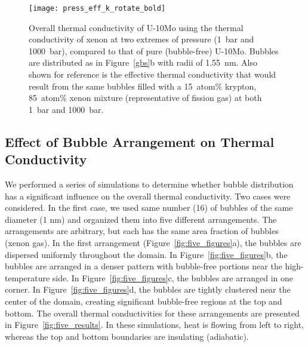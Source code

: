 \begin{figure}
	\centering
	\texttt{[image: press\_eff\_k\_rotate\_bold]}
	\caption[Overall thermal conductivity of \mbox{U-10Mo} using the thermal 
        conductivity of xenon at two extremes of pressure
        (1~bar and 1000~bar), compared to that of pure (bubble-free) \mbox{U-10Mo}]{Overall thermal conductivity of \mbox{U-10Mo} using the thermal 
        conductivity of xenon at two extremes of pressure
        (1~bar and 1000~bar), compared to that of pure (bubble-free) \mbox{U-10Mo}.
        Bubbles are distributed as in Figure~\ref{gbs}b with radii of 1.55~nm.
        {Also shown for reference is the effective thermal
        conductivity that would result from the same bubbles filled with a
        15~atom\% krypton, 85~atom\% xenon mixture (representative of fission
        gas) at both 1~bar and 1000~bar.}}
	\label{fig_press_K}
\end{figure}

\subsection{Effect of Bubble Arrangement on Thermal Conductivity}
\label{subsec:area}
We performed a series of simulations to determine whether bubble distribution has a significant influence on the overall thermal conductivity. Two cases were considered. In the first case, we used same number (16) of bubbles of the same diameter (1 nm) and organized them into five different arrangements. The arrangements are arbitrary, but each has the same area fraction of bubbles (xenon gas). In the first arrangement (Figure~\ref{fig:five_figures}a), the bubbles are dispersed uniformly throughout the domain. In Figure~\ref{fig:five_figures}b, the bubbles are arranged in a denser pattern with bubble-free portions near the high-temperature side. In Figure~\ref{fig:five_figures}c, the bubbles are arranged in one corner. In Figure~\ref{fig:five_figures}d, the bubbles are tightly clustered near the center of the domain, creating significant bubble-free regions at the top and bottom. The overall thermal conductivities for these arrangements are presented in Figure~\ref{fig:five_results}.
In these simulations, heat is flowing from left to right, whereas the top and bottom boundaries are insulating (adiabatic).


